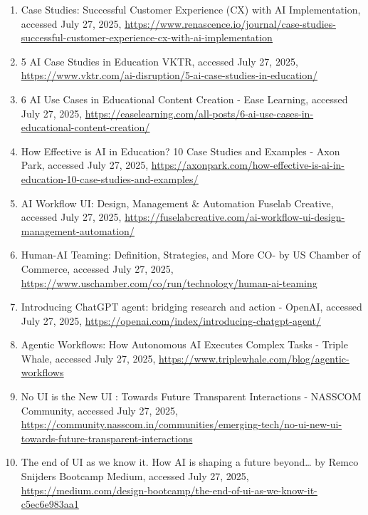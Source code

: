 \documentclass[
  12pt,
  a4paper,
  bibliography=totoc,
  numbers=noenddot
]{scrartcl}
\begin{document}
\begin{enumerate}
\item
  Case Studies: Successful Customer Experience (CX) with AI
  Implementation, accessed July 27, 2025,
  \href{https://www.renascence.io/journal/case-studies-successful-customer-experience-cx-with-ai-implementation}{\ul{https://www.renascence.io/journal/case-studies-successful-customer-experience-cx-with-ai-implementation}}
\item
  5 AI Case Studies in Education \textbar{} VKTR, accessed July 27,
  2025,
  \href{https://www.vktr.com/ai-disruption/5-ai-case-studies-in-education/}{\ul{https://www.vktr.com/ai-disruption/5-ai-case-studies-in-education/}}
\item
  6 AI Use Cases in Educational Content Creation - Ease Learning,
  accessed July 27, 2025,
  \href{https://easelearning.com/all-posts/6-ai-use-cases-in-educational-content-creation/}{\ul{https://easelearning.com/all-posts/6-ai-use-cases-in-educational-content-creation/}}
\item
  How Effective is AI in Education? 10 Case Studies and Examples - Axon
  Park, accessed July 27, 2025,
  \href{https://axonpark.com/how-effective-is-ai-in-education-10-case-studies-and-examples/}{\ul{https://axonpark.com/how-effective-is-ai-in-education-10-case-studies-and-examples/}}
\item
  AI Workflow UI: Design, Management \& Automation \textbar{} Fuselab
  Creative, accessed July 27, 2025,
  \href{https://fuselabcreative.com/ai-workflow-ui-design-management-automation/}{\ul{https://fuselabcreative.com/ai-workflow-ui-design-management-automation/}}
\item
  Human-AI Teaming: Definition, Strategies, and More \textbar{} CO- by
  US Chamber of Commerce, accessed July 27, 2025,
  \href{https://www.uschamber.com/co/run/technology/human-ai-teaming}{\ul{https://www.uschamber.com/co/run/technology/human-ai-teaming}}
\item
  Introducing ChatGPT agent: bridging research and action - OpenAI,
  accessed July 27, 2025,
  \href{https://openai.com/index/introducing-chatgpt-agent/}{\ul{https://openai.com/index/introducing-chatgpt-agent/}}
\item
  Agentic Workflows: How Autonomous AI Executes Complex Tasks - Triple
  Whale, accessed July 27, 2025,
  \href{https://www.triplewhale.com/blog/agentic-workflows}{\ul{https://www.triplewhale.com/blog/agentic-workflows}}
\item
  No UI is the New UI : Towards Future Transparent Interactions -
  NASSCOM Community, accessed July 27, 2025,
  \href{https://community.nasscom.in/communities/emerging-tech/no-ui-new-ui-towards-future-transparent-interactions}{\ul{https://community.nasscom.in/communities/emerging-tech/no-ui-new-ui-towards-future-transparent-interactions}}
\item
  The end of UI as we know it. How AI is shaping a future beyond\ldots{}
  \textbar{} by Remco Snijders \textbar{} Bootcamp \textbar{} Medium,
  accessed July 27, 2025,
  \href{https://medium.com/design-bootcamp/the-end-of-ui-as-we-know-it-c5ec6e983aa1}{\ul{https://medium.com/design-bootcamp/the-end-of-ui-as-we-know-it-c5ec6e983aa1}}
\end{enumerate}
\fi
\end{document}
